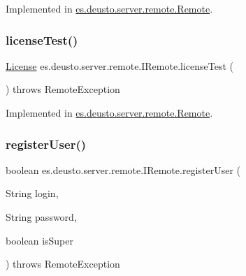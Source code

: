 Implemented in \hyperlink{classes_1_1deusto_1_1server_1_1remote_1_1_remote_a09318956131f355c8b43f93e3c3afea4}{es.\+deusto.\+server.\+remote.\+Remote}.

\mbox{\label{interfacees_1_1deusto_1_1server_1_1remote_1_1_i_remote_a58d270fcac4cf9bc4ccd7fb45dd92753}} 
\subsubsection{\texorpdfstring{license\+Test()}{licenseTest()}}
{\footnotesize\ttfamily \hyperlink{classes_1_1deusto_1_1server_1_1db_1_1data_1_1_license}{License} es.\+deusto.\+server.\+remote.\+I\+Remote.\+license\+Test (\begin{DoxyParamCaption}{ }\end{DoxyParamCaption}) throws Remote\+Exception}



Implemented in \hyperlink{classes_1_1deusto_1_1server_1_1remote_1_1_remote_a58e6d2180aeea8259ea29392ffe70b8b}{es.\+deusto.\+server.\+remote.\+Remote}.

\mbox{\label{interfacees_1_1deusto_1_1server_1_1remote_1_1_i_remote_af5be134b00959135119e13a5980a4364}} 
\subsubsection{\texorpdfstring{register\+User()}{registerUser()}}
{\footnotesize\ttfamily boolean es.\+deusto.\+server.\+remote.\+I\+Remote.\+register\+User (\begin{DoxyParamCaption}\item[{String}]{login,  }\item[{String}]{password,  }\item[{boolean}]{is\+Super }\end{DoxyParamCaption}) throws Remote\+Exception}



